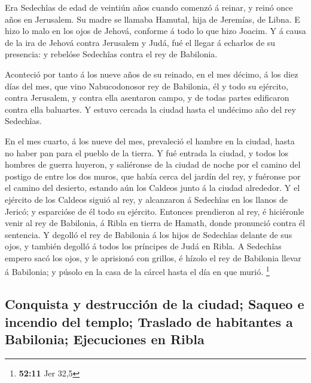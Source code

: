  Era Sedechîas de edad de veintiún años cuando comenzó á
reinar, y reinó once años en Jerusalem. Su madre se llamaba Hamutal,
hija de Jeremías, de Libna.  E hizo lo malo en los ojos de
Jehová, conforme á todo lo que hizo Joacim.  Y á causa de la
ira de Jehová contra Jerusalem y Judá, fué el llegar á echarlos de su
presencia: y rebelóse Sedechîas contra el rey de Babilonia.

 Aconteció por tanto á los nueve años de su reinado, en el
mes décimo, á los diez días del mes, que vino Nabucodonosor rey de
Babilonia, él y todo su ejército, contra Jerusalem, y contra ella
asentaron campo, y de todas partes edificaron contra ella baluartes.
 Y estuvo cercada la ciudad hasta el undécimo año del rey
Sedechîas.

 En el mes cuarto, á los nueve del mes, prevaleció el hambre
en la ciudad, hasta no haber pan para el pueblo de la tierra.
 Y fué entrada la ciudad, y todos los hombres de guerra
huyeron, y saliéronse de la ciudad de noche por el camino del postigo de
entre los dos muros, que había cerca del jardín del rey, y fuéronse por
el camino del desierto, estando aún los Caldeos junto á la ciudad
alrededor.  Y el ejército de los Caldeos siguió al rey, y
alcanzaron á Sedechîas en los llanos de Jericó; y esparcióse de él todo
su ejército.  Entonces prendieron al rey, é hiciéronle venir
al rey de Babilonia, á Ribla en tierra de Hamath, donde pronunció contra
él sentencia.  Y degolló el rey de Babilonia á los hijos de
Sedechîas delante de sus ojos, y también degolló á todos los príncipes
de Judá en Ribla.  A Sedechîas empero sacó los ojos, y le
aprisionó con grillos, é hízolo el rey de Babilonia llevar á Babilonia;
y púsolo en la casa de la cárcel hasta el día en que murió. \footnote{\textbf{52:11}
  Jer 32,5}

\hypertarget{conquista-y-destrucciuxf3n-de-la-ciudad-saqueo-e-incendio-del-templo-traslado-de-habitantes-a-babilonia-ejecuciones-en-ribla}{%
\subsection{Conquista y destrucción de la ciudad; Saqueo e incendio del
templo; Traslado de habitantes a Babilonia; Ejecuciones en
Ribla}\label{conquista-y-destrucciuxf3n-de-la-ciudad-saqueo-e-incendio-del-templo-traslado-de-habitantes-a-babilonia-ejecuciones-en-ribla}}

